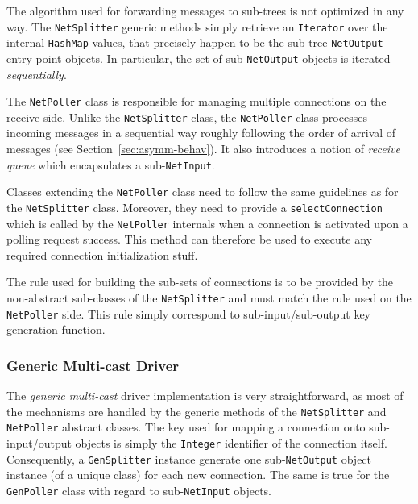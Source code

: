 \documentclass[11pt]{book}
\begin{document}
The algorithm used for forwarding messages to sub-trees is not
optimized in any way. The \texttt{NetSplitter} generic methods simply
retrieve an \texttt{Iterator} over the internal \texttt{HashMap}
values, that precisely happen to be the sub-tree \texttt{NetOutput}
entry-point objects. In particular, the set of sub-\texttt{NetOutput}
objects is iterated \emph{sequentially}.

The \texttt{NetPoller} class is responsible for managing multiple
connections on the receive side. Unlike the \texttt{NetSplitter}
class, the \texttt{NetPoller} class processes incoming messages in a
sequential way roughly following the order of arrival of messages (see
Section~\ref{sec:asymm-behav}). It also introduces a notion of
\emph{receive queue} which encapsulates a sub-\texttt{NetInput}.

Classes extending the \texttt{NetPoller} class need to follow the same
guidelines as for the \texttt{NetSplitter} class. Moreover, they need
to provide a \texttt{selectConnection} which is called by the
\texttt{NetPoller} internals when a connection is activated upon a
polling request success. This method can therefore be used to execute
any required connection initialization stuff.

The rule used for building the sub-sets of connections is to be
provided by the non-abstract sub-classes of the \texttt{NetSplitter}
and must match the rule used on the \texttt{NetPoller} side. This rule
simply correspond to sub-input/sub-output key generation function.

%
\subsubsection{Generic Multi-cast Driver}
\label{sec:gener-mult-driv}
The \emph{generic multi-cast} driver implementation is very
straightforward, as most of the mechanisms are handled by the generic
methods of the \texttt{NetSplitter} and \texttt{NetPoller} abstract
classes. The key used for mapping a connection onto sub-input/output
objects is simply the \texttt{Integer} identifier of the connection
itself. Consequently, a \texttt{GenSplitter} instance generate one
sub-\texttt{NetOutput} object instance (of a unique class) for each
new connection. The same is true for the \texttt{GenPoller} class with
regard to sub-\texttt{NetInput} objects.

%
\end{document}
